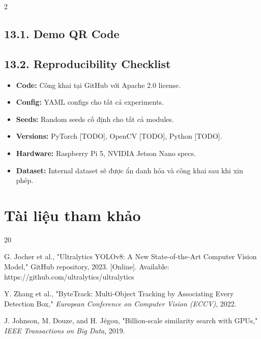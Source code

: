 \documentclass[a4paper,13pt]{article}
\begin{document}
\begin{multicols}{2}
\subsection*{13.1. Demo QR Code}
\begin{minipage}[b]{0.15\textwidth}
    \centering
\end{minipage}

\subsection*{13.2. Reproducibility Checklist}
\begin{itemize}
    \item \textbf{Code:} Công khai tại GitHub với Apache 2.0 license.
    \item \textbf{Config:} YAML configs cho tất cả experiments.
    \item \textbf{Seeds:} Random seeds cố định cho tất cả modules.
    \item \textbf{Versions:} PyTorch [TODO], OpenCV [TODO], Python [TODO].
    \item \textbf{Hardware:} Raspberry Pi 5, NVIDIA Jetson Nano specs.
    \item \textbf{Dataset:} Internal dataset sẽ được ẩn danh hóa và công khai sau khi xin phép.
\end{itemize}

\section*{Tài liệu tham khảo}

\begin{thebibliography}{20}
\fontsize{11}{13}\selectfont

G. Jocher et al., "Ultralytics YOLOv8: A New State-of-the-Art Computer Vision Model," GitHub repository, 2023. [Online]. Available: https://github.com/ultralytics/ultralytics

Y. Zhang et al., "ByteTrack: Multi-Object Tracking by Associating Every Detection Box," \textit{European Conference on Computer Vision (ECCV)}, 2022.

J. Johnson, M. Douze, and H. Jégou, "Billion-scale similarity search with GPUs," \textit{IEEE Transactions on Big Data}, 2019.


\end{thebibliography}
\end{multicols}
\end{document}
